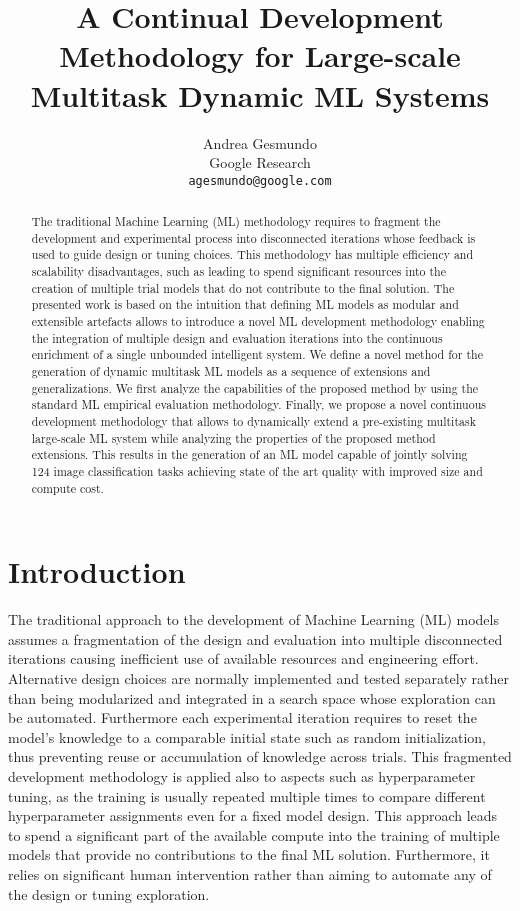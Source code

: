 \documentclass{article} \usepackage{iclr2023_conference,times}
\title{A Continual Development Methodology for Large-scale  Multitask Dynamic ML Systems}
\author{Andrea Gesmundo \\
  Google Research \\
  \texttt{agesmundo@google.com} \\
}
\begin{document}
\maketitle

\begin{abstract}
The traditional Machine Learning (ML) methodology requires to fragment the development and experimental process into disconnected iterations whose feedback is used to guide design or tuning choices.
This methodology has multiple efficiency and scalability disadvantages, such as leading to spend significant resources into the creation of multiple trial models that do not contribute to the final solution.
The presented work is based on the intuition that defining ML models as modular and extensible artefacts allows to introduce a novel ML development methodology enabling the integration of multiple design and evaluation iterations into the continuous enrichment of a single unbounded intelligent system.
We define a novel
method for the generation of dynamic multitask ML models as a sequence of extensions and generalizations.
We first analyze the capabilities of the proposed method
by using the standard ML empirical evaluation methodology.
Finally, we propose a novel continuous development methodology that allows to dynamically extend a pre-existing multitask large-scale ML system while analyzing the properties of the proposed method extensions.
This results in the generation of an ML model capable of jointly solving 124 image classification tasks achieving state of the art quality with improved size and compute cost.

\end{abstract}

\section{Introduction}

The traditional approach to the development of Machine Learning (ML) models assumes a fragmentation of the design and evaluation into multiple disconnected iterations causing inefficient use of available resources and engineering effort.
Alternative design choices are normally implemented and tested separately rather than being modularized and integrated in a search space whose exploration can be automated.
Furthermore each experimental iteration requires to reset the model's knowledge to a comparable initial state such as random initialization, thus preventing reuse or accumulation of knowledge across trials.
This fragmented development methodology is applied also to aspects such as hyperparameter tuning, as the training is usually repeated multiple times to compare different hyperparameter assignments even for a fixed model design.
This approach leads to spend a significant part of the available compute into the training of multiple models that provide no contributions to the final ML solution.
Furthermore, it relies on significant human intervention rather than aiming to automate any of the design or tuning exploration.
\end{document}
